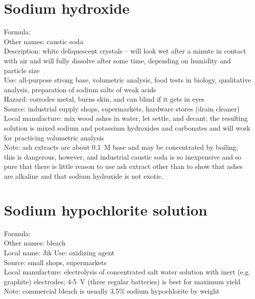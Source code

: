 \section{Sodium hydroxide}
\label{sec:}
Formula: \\
Other names: caustic soda\\
Description: white deliquescent crystals -- 
will look wet after a minute in contact with air 
and will fully dissolve after some time, 
depending on humidity and particle size\\ 
Use: all-purpose strong base, 
volumetric analysis, 
food tests in biology, 
qualitative analysis, 
preparation of sodium salts of weak acids\\
Hazard: corrodes metal, 
burns skin, 
and can blind if it gets in eyes\\
Source: industrial supply shops, 
supermarkets, 
hardware stores (drain cleaner)\\
Local manufacture: mix wood ashes in water, 
let settle, 
and decant; 
the resulting solution is mixed sodium and potassium hydroxides 
and carbonates and will work for practicing volumetric analysis\\
Note: ash extracts are about 0.1~M base and may be concentrated by boiling; 
this is dangerous, 
however, 
and industrial caustic soda is so inexpensive 
and so pure that there is little reason to use ash extract 
other than to show that ashes are alkaline 
and that sodium hydroxide is not exotic.

\section{Sodium hypochlorite solution}
\label{sec:}
Formula: \\
Other names: bleach\\
Local name: Jik
Use: oxidizing agent\\
Source: small shops, 
supermarkets\\
Local manufacture: electrolysis of concentrated salt water solution 
with inert (e.g. 
graphite) electrodes; 
4-5~V (three regular batteries) is best for maximum yield\\
Note: commercial bleach is usually 3.5\% sodium hypochlorite by weight

